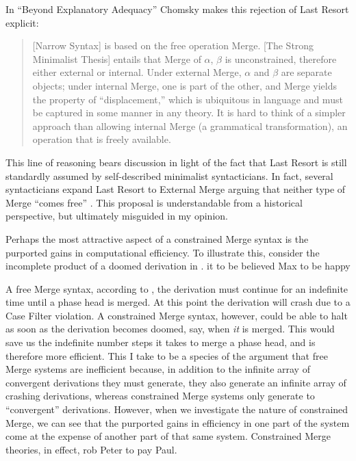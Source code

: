 \documentclass[MilwayThesis]{subfiles}
\begin{document}
In ``Beyond Explanatory Adequacy'' \parencite[][henceforth, \textit{BEA}]{chomsky2004beyond} Chomsky makes this rejection of Last Resort explicit:
\begin{quote}
	[Narrow Syntax] is based on the free operation Merge.
	[The Strong Minimalist Thesis] entails that Merge of $\alpha$, $\beta$ is unconstrained, therefore either external or internal.
	Under external Merge, $\alpha$ and $\beta$ are separate objects; 
	under internal Merge, one is part of the other, and Merge yields the property of ``displacement,'' which is ubiquitous in language and must be captured in some manner in any theory. 
	It is hard to think of a simpler approach than allowing	internal Merge (a grammatical transformation), an operation that is freely available.
	\parencite[110]{chomsky2004beyond}
\end{quote}
This line of reasoning bears discussion in light of the fact that Last Resort is still standardly assumed by self-described minimalist syntacticians.
In fact, several syntacticians expand Last Resort to External Merge arguing that neither type of Merge ``comes free'' \parencite{pesetsky2006probes,frampton2008crash,wurmbrand2014merge,yokoyama2015features}.
This proposal is understandable from a historical perspective, but ultimately misguided in my opinion.

Perhaps the most attractive aspect of a constrained Merge syntax is the purported gains in computational efficiency.
To illustrate this, \textcite{frampton2008crash} consider the incomplete product of a doomed derivation in \Next
\ex. it to be believed Max to be happy

A free Merge syntax, according to \textcite{frampton2008crash}, the derivation must continue for an indefinite time until a phase head is merged.
At this point the derivation will crash due to a Case Filter violation.
A constrained Merge syntax, however, could be able to halt as soon as the derivation becomes doomed, say, when \textit{it} is merged.
This would save us the indefinite number steps it takes to merge a phase head, and is therefore more efficient.
This I take to be a species of the argument that free Merge systems are inefficient because, in addition to the infinite array of convergent derivations they must generate, they also generate an infinite array of crashing derivations, whereas constrained Merge systems only generate to ``convergent'' derivations.
However, when we investigate the nature of constrained Merge, we can see that the purported gains in efficiency in one part of the system come at the expense of another part of that same system.
Constrained Merge theories, in effect, rob Peter to pay Paul.
\end{document}
